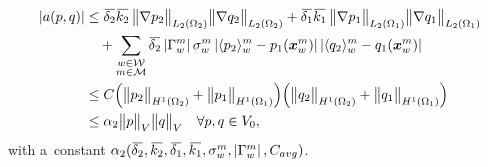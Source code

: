 \begin{align} \label{eqn:prim_form_a_bound}
    \abs{a(p,q)} &\leq \overbar{\delta_2}\overbar{k_2}\, \norm{\grad p_2}_{L_2(\Omega_2)} \norm{\grad q_2}_{L_2(\Omega_2)}
        + \overbar{\delta_1}\overbar{k_1}\, \norm{\grad p_1}_{L_2(\Omega_1)} \norm{\grad q_1}_{L_2(\Omega_1)} \\
        &\quad + \sum_{\substack{w\in \mathcal{W} \\ m\in \mathcal{M}}} \overbar{\delta_2} \abs{\Gamma^m_w} \sigma^m_w
            \abs{\avg{p_2}^m_w - p_1(\vc x^m_w)}\abs{\avg{q_2}^m_w - q_1(\vc x^m_w)}\\
    &\leq C \Big( \norm{p_2}_{H^1(\Omega_2)} + \norm{p_1}_{H^1(\Omega_1)} \Big) \Big( \norm{q_2}_{H^1(\Omega_2)} + \norm{q_1}_{H^1(\Omega_1)} \Big) \\
    &\leq \alpha_2 \norm{p}_V \norm{q}_V \quad \forall p,q\in V_0,
\end{align}
with a~constant $\alpha_2(\overbar{\delta_2},\overbar{k_2},\overbar{\delta_1},\overbar{k_1},\sigma^m_w,\abs{\Gamma^m_w},C_{avg})$.

